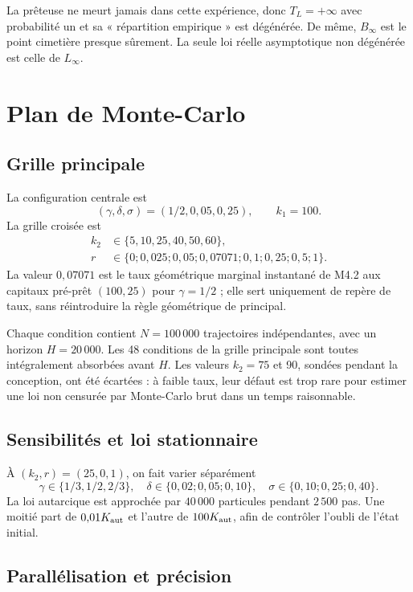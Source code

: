 \documentclass[11pt,a4paper]{article}
\begin{document}
La prêteuse ne meurt jamais dans cette expérience, donc
$T_L=+\infty$ avec probabilité un et sa « répartition empirique » est
dégénérée. De même, $B_\infty$ est le point cimetière presque sûrement.
La seule loi réelle asymptotique non dégénérée est celle de $L_\infty$.

\section{Plan de Monte-Carlo}

\subsection{Grille principale}

La configuration centrale est
\begin{equation}
(\gamma,\delta,\sigma)=(1/2,0{,}05,0{,}25),
\qquad k_1=100.
\label{eq:baseline}
\end{equation}
La grille croisée est
\begin{align}
k_2&\in\{5,10,25,40,50,60\},\\
r&\in\{0;0{,}025;0{,}05;0{,}07071;0{,}1;0{,}25;0{,}5;1\}.
\end{align}
La valeur $0{,}07071$ est le taux géométrique marginal instantané de M4.2
aux capitaux pré-prêt $(100,25)$ pour $\gamma=1/2$ ; elle sert uniquement
de repère de taux, sans réintroduire la règle géométrique de principal.

Chaque condition contient $N=100\,000$ trajectoires indépendantes, avec
un horizon $H=20\,000$. Les 48 conditions de la grille principale sont
toutes intégralement absorbées avant $H$. Les valeurs $k_2=75$ et 90,
sondées pendant la conception, ont été écartées : à faible taux, leur
défaut est trop rare pour estimer une loi non censurée par Monte-Carlo
brut dans un temps raisonnable.

\subsection{Sensibilités et loi stationnaire}

À $(k_2,r)=(25,0{,}1)$, on fait varier séparément
\[
\gamma\in\{1/3,1/2,2/3\},\quad
\delta\in\{0{,}02;0{,}05;0{,}10\},\quad
\sigma\in\{0{,}10;0{,}25;0{,}40\}.
\]
La loi autarcique est approchée par $40\,000$ particules pendant
$2\,500$ pas. Une moitié part de $0{,}01K_{\rm aut}$ et l'autre de
$100K_{\rm aut}$, afin de contrôler l'oubli de l'état initial.

\subsection{Parallélisation et précision}
\end{document}
